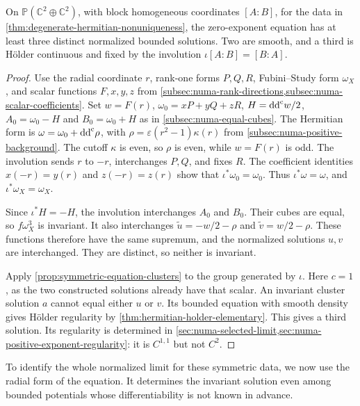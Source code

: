 \begin{corollary}\label{cor:numa-third-solution}
On $\mathbb P(\mathbb C^2\oplus\mathbb C^2)$, with block homogeneous coordinates $[A:B]$, for the data in \cref{thm:degenerate-hermitian-nonuniqueness}, the zero-exponent equation has at least three distinct normalized bounded solutions. Two are smooth, and a third is H\"older continuous and fixed by the involution $\iota[A:B]=[B:A]$.
\end{corollary}
\begin{proof}
Use the radial coordinate $r$, rank-one forms $P,Q,R$, Fubini--Study form $\omega_X$, and scalar functions $F,x,y,z$ from \cref{subsec:numa-rank-directions,subsec:numa-scalar-coefficients}. Set $w=F(r)$, $\omega_0=xP+yQ+zR$, $H=\mathrm{dd}^{\mathrm{c}} w/2$, $A_0=\omega_0-H$ and $B_0=\omega_0+H$ as in \cref{subsec:numa-equal-cubes}. The Hermitian form is $\omega=\omega_0+\mathrm{dd}^{\mathrm{c}}\rho$, with $\rho=\varepsilon(r^2-1)\kappa(r)$ from \cref{subsec:numa-positive-background}. The cutoff $\kappa$ is even, so $\rho$ is even, while $w=F(r)$ is odd. The involution sends $r$ to $-r$, interchanges $P,Q$, and fixes $R$. The coefficient identities $x(-r)=y(r)$ and $z(-r)=z(r)$ show that $\iota^*\omega_0=\omega_0$. Thus $\iota^*\omega=\omega$, and $\iota^*\omega_X=\omega_X$.

Since $\iota^*H=-H$, the involution interchanges $A_0$ and $B_0$. Their cubes are equal, so $f\omega_X^3$ is invariant. It also interchanges $\widetilde u=-w/2-\rho$ and $\widetilde v=w/2-\rho$. These functions therefore have the same supremum, and the normalized solutions $u,v$ are interchanged. They are distinct, so neither is invariant.

Apply \cref{prop:symmetric-equation-clusters} to the group generated by $\iota$. Here $c=1$, as the two constructed solutions already have that scalar. An invariant cluster solution $a$ cannot equal either $u$ or $v$. Its bounded equation with smooth density gives H\"older regularity by \cref{thm:hermitian-holder-elementary}. This gives a third solution. Its regularity is determined in \cref{sec:numa-selected-limit,sec:numa-positive-exponent-regularity}: it is $C^{1,1}$ but not $C^2$.
\end{proof}

To identify the whole normalized limit for these symmetric data, we now use the radial form of the equation. It determines the invariant solution even among bounded potentials whose differentiability is not known in advance.
